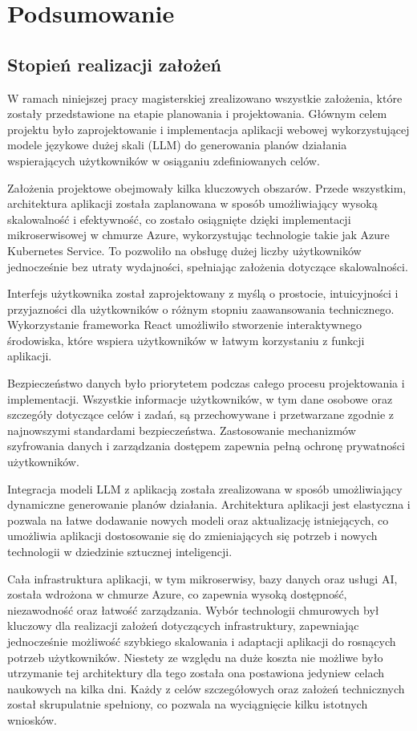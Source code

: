 \section{Podsumowanie}
\subsection{Stopień realizacji założeń}
W ramach niniejszej pracy magisterskiej zrealizowano wszystkie założenia, które zostały przedstawione na etapie planowania i projektowania. Głównym celem projektu było zaprojektowanie i implementacja aplikacji webowej wykorzystującej modele językowe dużej skali (LLM) do generowania planów działania wspierających użytkowników w osiąganiu zdefiniowanych celów.

Założenia projektowe obejmowały kilka kluczowych obszarów. Przede wszystkim, architektura aplikacji została zaplanowana w sposób umożliwiający wysoką skalowalność i efektywność, co zostało osiągnięte dzięki implementacji mikroserwisowej w chmurze Azure, wykorzystując technologie takie jak Azure Kubernetes Service. To pozwoliło na obsługę dużej liczby użytkowników jednocześnie bez utraty wydajności, spełniając założenia dotyczące skalowalności.

Interfejs użytkownika został zaprojektowany z myślą o prostocie, intuicyjności i przyjazności dla użytkowników o różnym stopniu zaawansowania technicznego. Wykorzystanie frameworka React umożliwiło stworzenie interaktywnego środowiska, które wspiera użytkowników w łatwym korzystaniu z funkcji aplikacji.

Bezpieczeństwo danych było priorytetem podczas całego procesu projektowania i implementacji. Wszystkie informacje użytkowników, w tym dane osobowe oraz szczegóły dotyczące celów i zadań, są przechowywane \linebreak i przetwarzane zgodnie z najnowszymi standardami bezpieczeństwa. Zastosowanie mechanizmów szyfrowania danych i zarządzania dostępem zapewnia pełną ochronę prywatności użytkowników.

Integracja modeli LLM z aplikacją została zrealizowana w sposób umożliwiający dynamiczne generowanie planów działania. Architektura aplikacji jest elastyczna i pozwala na łatwe dodawanie nowych modeli oraz aktualizację istniejących, co umożliwia aplikacji dostosowanie się do zmieniających się potrzeb i nowych technologii w dziedzinie sztucznej inteligencji.

Cała infrastruktura aplikacji, w tym mikroserwisy, bazy danych oraz usługi AI, została wdrożona w chmurze Azure, co zapewnia wysoką dostępność, niezawodność oraz łatwość zarządzania. Wybór technologii chmurowych był kluczowy dla realizacji założeń dotyczących infrastruktury, zapewniając jednocześnie możliwość szybkiego skalowania i adaptacji aplikacji do rosnących potrzeb użytkowników. Niestety ze względu na duże koszta nie możliwe było utrzymanie tej architektury dla tego została ona postawiona jedynie\linebreak w celach naukowych na kilka dni. Każdy z celów szczegółowych oraz założeń technicznych został skrupulatnie spełniony, co pozwala na wyciągnięcie kilku istotnych wniosków.
